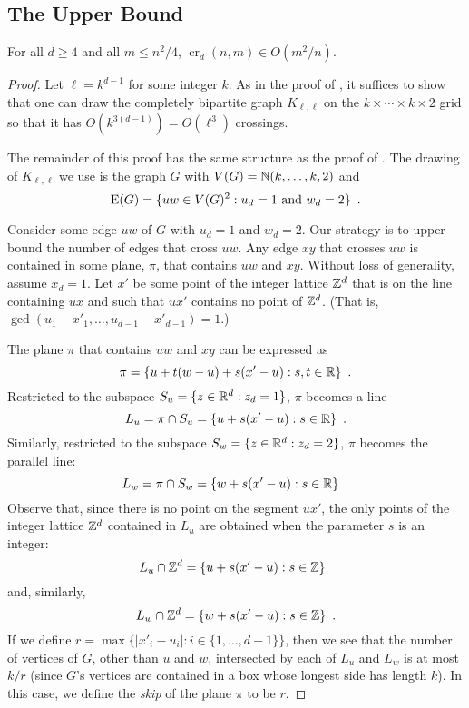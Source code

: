 \documentclass{patmorin}
\DeclareMathOperator{\crs}{cr}
\begin{document}
\subsection{The Upper Bound}

\begin{thm}
  For all $d\ge 4$ and all $m\le n^2/4$, $\crs_d(n,m)\in O(m^2/n)$.
\end{thm}

\begin{proof}
  Let $\ell=k^{d-1}$ for some integer $k$.  As in the proof of
  , it suffices to show that one can draw the
  completely bipartite graph $K_{\ell,\ell}$ on the $k\times\cdots\times
  k\times 2$ grid so that it has $O(k^{3(d-1)})=O(\ell^3)$ crossings.

  The remainder of this proof has the same structure as the proof of
  .  The drawing of $K_{\ell,\ell}$ we use is the graph
  $G$ with $V(G)=\mathbb{N}(k,\ldots,k,2)$ and
  \[
    \mathrm{E}(G) = \{ uw\in V(G)^2 :\mbox{$u_d = 1$ and $w_d = 2$} \} \enspace .
  \]
  
  Consider some edge $uw$ of $G$ with $u_d=1$ and $w_d=2$.  Our strategy
  is to upper bound the number of edges that cross $uw$.  Any edge $xy$
  that crosses $uw$ is contained in some plane, $\pi$, that contains $uw$
  and $xy$.  Without loss of generality, assume $x_d=1$.  Let $x'$ be some
  point of the integer lattice $\mathbb{Z}^d$ that is on the line containing
  $ux$ and such that $ux'$ contains no point of $\mathbb{Z}^d$. (That is,
  $\gcd(u_1-x'_1,\ldots,u_{d-1}-x'_{d-1}) = 1$.)

  The plane $\pi$ that contains $uw$ and $xy$ can be expressed as
  \[
     \pi = \{ u + t(w-u) + s(x'-u) : s,t\in\mathbb{R}\} \enspace .
  \]
  Restricted to the subspace $S_u=\{z\in\mathbb{R}^d: z_d=1\}$, $\pi$
  becomes a line
  \[
     L_u = \pi\cap S_u = \{ u + s(x'-u) : s\in\mathbb{R}\} \enspace .
  \]
  Similarly, restricted to the subspace $S_w=\{z\in\mathbb{R}^d: z_d=2\}$,
  $\pi$ becomes the parallel line:
  \[
     L_w = \pi\cap S_w = \{ w + s(x'-u) : s\in\mathbb{R}\} \enspace .
  \]
  Observe that, since there is no point on the segment $ux'$, the only
  points of the integer lattice $\mathbb{Z}^d$ contained in $L_u$ are obtained
  when the parameter $s$ is an integer:
  \[
     L_u\cap\mathbb{Z}^d = \{ u + s(x'-u) : s\in\mathbb{Z}\} \enspace 
  \]
  and, similarly,
  \[
     L_w\cap\mathbb{Z}^d = \{ w + s(x'-u) : s\in\mathbb{Z}\} \enspace  .
  \]
  If we define $r=\max\{|x'_i-u_i| : i\in\{1,\ldots,d-1\}\}$, then we see
  that the number of vertices of $G$, other than $u$ and $w$, intersected
  by each of $L_u$ and $L_w$ is at most $k/r$ (since $G$'s vertices are
  contained in a box whose longest side has length $k$).  In this case,
  we define the \emph{skip} of the plane $\pi$ to be $r$.
  

\end{proof}
\end{document}
